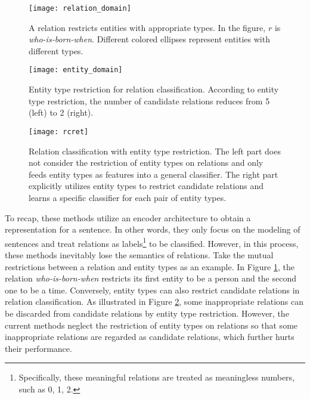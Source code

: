 \documentclass[11pt,a4paper]{article}
\begin{document}
\begin{figure}[t]
	\centering
	\texttt{[image: relation\_domain]}
	\caption{A relation restricts entities  with appropriate types. 
		In the figure,  $r$ is \textit{who-is-born-when}. 
		Different colored ellipses represent entities with different types.
	}
	\label{fig:relation_domain}
\end{figure}

\begin{figure}[t]
	\centering
	\texttt{[image: entity\_domain]}
	\caption{Entity type restriction for relation classification. 
		According to entity type restriction, the number of candidate relations reduces from 5 (left) to 2 (right).}
	\label{fig:entity_type_restriction}
\end{figure}

\begin{figure*}[t]
	\centering
	\texttt{[image: rcret]}
	\caption{Relation classification with entity type restriction. 
The left part  does not consider the restriction of entity types on relations and 
		only feeds entity types as features into a general classifier. 
		The right part explicitly utilizes entity types to restrict candidate relations and 
		learns a specific classifier for each pair of entity types.
	}
	\label{fig:rcret}
\end{figure*}

To recap, these methods utilize an encoder architecture \cite{Badrinarayanan-etal-2017-segnet} to obtain a representation for a sentence. 
In other words, they only focus on the modeling of sentences and treat relations as 
labels\footnote{Specifically, these meaningful relations are treated as meaningless numbers, such as 0, 1, 2. } to be classified.
However, in this process, these methods inevitably lose the semantics of relations.  
Take the mutual restrictions between a relation and entity types as an example.
In Figure \ref{fig:relation_domain}, the relation \textit{who-is-born-when} 
restricts its first entity to be a person and the second one to be a time.
Conversely, entity types  can also restrict candidate relations in relation classification.
As illustrated in Figure \ref{fig:entity_type_restriction}, 
some inappropriate relations can be discarded from candidate relations by entity type restriction. 
However, the current methods neglect the restriction of entity types on relations 
so that some inappropriate relations are regarded as candidate relations, 
which further hurts their performance. 
\end{document}
